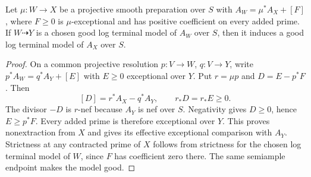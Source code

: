 \begin{lemma}
\label{prog:remove-preparation}
Let $\mu:W\to X$ be a projective smooth preparation over $S$ with
$A_W=\mu^*A_X+[F]$, where $F\geq0$ is $\mu$-exceptional and has
positive coefficient on every added prime. If $W\dashrightarrow Y$
is a chosen good log terminal model of $A_W$ over $S$, then it induces
a good log terminal model of $A_X$ over $S$.
\end{lemma}
\begin{proof}
On a common projective resolution $p:V\to W$, $q:V\to Y$, write
$p^*A_W=q^*A_Y+[E]$ with $E\geq0$ exceptional over $Y$.
Put $r=\mu p$ and $D=E-p^*F$. Then
\[
 [D]=r^*A_X-q^*A_Y,\qquad r_*D=r_*E\geq0.
\]
The divisor $-D$ is $r$-nef because $A_Y$ is nef over $S$.
Negativity gives $D\geq0$, hence $E\geq p^*F$. Every added prime
is therefore exceptional over $Y$. This proves nonextraction from
$X$ and gives its effective exceptional comparison with $A_Y$.
Strictness at any contracted prime of $X$ follows from strictness
for the chosen log terminal model of $W$, since $F$ has coefficient
zero there. The same semiample endpoint makes the model good.
\end{proof}

